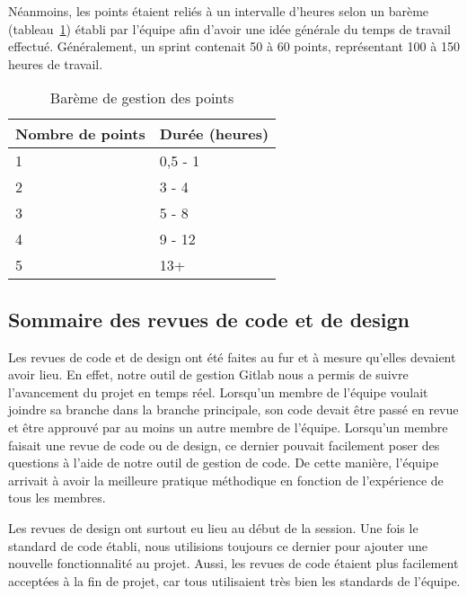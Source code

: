     Néanmoins, les points étaient reliés à un intervalle d'heures selon un barème (tableau~\ref{tab.bareme}) établi par l'équipe afin d'avoir une idée générale du temps de travail effectué. Généralement, un sprint contenait 50 à 60 points, représentant 100 à 150 heures de travail.
    
    \begin{table}[bhp]
        \centering
        \caption{Barème de gestion des points}
        \begingroup
        \renewcommand{\arraystretch}{1}
        \begin{tabular}{ll}
            \hline
            \bf Nombre de points & \bf Durée (heures) \\
            \hline
            \hline
            1 & 0,5 - 1 \\
            2 & 3 - 4 \\
            3 & 5 - 8 \\
            4 & 9 - 12 \\
            5 & 13+ \\
            \hline
        \end{tabular}
        \endgroup
        \label{tab.bareme}
    \end{table}

    \subsection{Sommaire des revues de code et de design}
    Les revues de code et de design ont été faites au fur et à mesure qu'elles devaient avoir lieu. En effet, notre outil de gestion Gitlab nous a permis de suivre l'avancement du projet en temps réel. Lorsqu'un membre de l'équipe voulait joindre sa branche dans la branche principale, son code devait être passé en revue et être approuvé par au moins un autre membre de l'équipe. Lorsqu'un membre faisait une revue de code ou de design, ce dernier pouvait facilement poser des questions à l'aide de notre outil de gestion de code. De cette manière, l'équipe arrivait à avoir la meilleure pratique méthodique en fonction de l'expérience de tous les membres.
 
    Les revues de design ont surtout eu lieu au début de la session. Une fois le standard de code établi, nous utilisions toujours ce dernier pour ajouter une nouvelle fonctionnalité au projet. Aussi, les revues de code étaient plus facilement acceptées à la fin de projet, car tous utilisaient très bien les standards de l'équipe.

